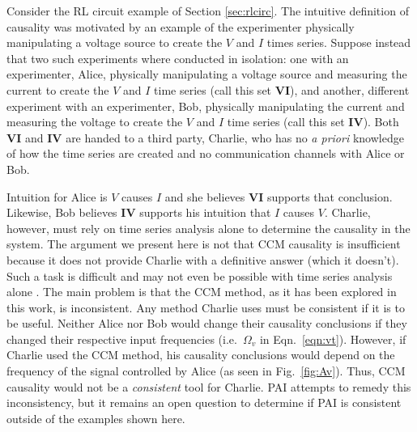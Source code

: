 \documentclass[twocolumn,aps,pre,groupedaddress]{revtex4-1}
\begin{document}
Consider the RL circuit example of Section \ref{sec:rlcirc}.  The intuitive definition of causality was motivated by an example of the experimenter physically manipulating a voltage source to create the $V$ and $I$ times series.  Suppose instead that two such experiments where conducted in isolation: one with an experimenter, Alice, physically manipulating a voltage source and measuring the current to create the $V$ and $I$ time series (call this set $\mathbf{VI}$), and another, different experiment with an experimenter, Bob, physically manipulating the current and measuring the voltage to create the $V$ and $I$ time series (call this set $\mathbf{IV}$).  Both $\mathbf{VI}$ and $\mathbf{IV}$ are handed to a third party, Charlie, who has no {\em a priori} knowledge of how the time series are created and no communication channels with Alice or Bob.

Intuition for Alice is $V$ causes $I$ and she believes $\mathbf{VI}$ supports that conclusion.  Likewise, Bob believes $\mathbf{IV}$ supports his intuition that $I$ causes $V$.  Charlie, however, must rely on time series analysis alone to determine the causality in the system.  The argument we present here is not that CCM causality is insufficient because it does not provide Charlie with a definitive answer (which it doesn't).  Such a task is difficult and may not even be possible with time series analysis alone \cite{Pearl2000}.  The main problem is that the CCM method, as it has been explored in this work, is inconsistent.  Any method Charlie uses must be consistent if it is to be useful.  Neither Alice nor Bob would change their causality conclusions if they changed their respective input frequencies (i.e.\ $\Omega_v$ in Eqn.\ \ref{eqn:vt}).  However, if Charlie used the CCM method, his causality conclusions would depend on the frequency of the signal controlled by Alice (as seen in Fig.\ \ref{fig:Av}).  Thus, CCM causality would not be a {\em consistent} tool for Charlie.  PAI attempts to remedy this inconsistency, but it remains an open question to determine if PAI is consistent outside of the examples shown here.

%

\end{document}
